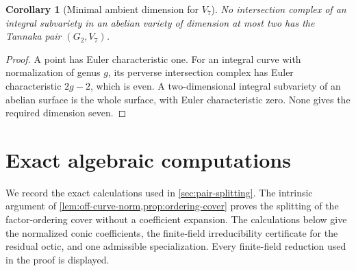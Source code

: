 \documentclass[10pt]{amsart}
\numberwithin{equation}{section}
\newtheorem{corollary}[theorem]{Corollary}
\theoremstyle{definition}
\theoremstyle{remark}
\begin{document}
\begin{corollary}[Minimal ambient dimension for $V_7$]
No intersection complex of an integral subvariety in an abelian variety
of dimension at most two has the Tannaka pair $(G_2,V_7)$.
\end{corollary}
\begin{proof}
A point has Euler characteristic one.  For an integral curve with
normalization of genus $g$, its perverse intersection complex has Euler
characteristic $2g-2$, which is even.  A two-dimensional integral
subvariety of an abelian surface is the whole surface, with Euler
characteristic zero.  None gives the required dimension seven.
\end{proof}

\appendix

\section{Exact algebraic computations}\label{app:exact-norm}

We record the exact calculations used in \cref{sec:pair-splitting}.  The
intrinsic argument of \cref{lem:off-curve-norm,prop:ordering-cover} proves the
splitting of the factor-ordering cover without a coefficient expansion.  The
calculations below give the normalized conic coefficients, the finite-field
irreducibility certificate for the residual octic, and one admissible
specialization.  Every finite-field reduction used in the proof is displayed.
\end{document}
